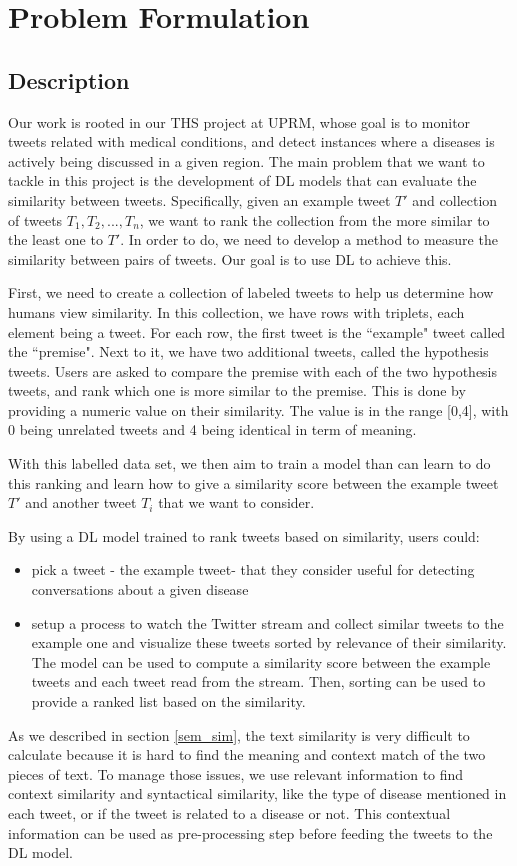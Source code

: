 \documentclass[12pt]{report}
\begin{document}
\chapter{Problem Formulation} \label{chapter 3}
\section{Description}
Our work is rooted in our \ac{THS} project at UPRM, whose goal is to monitor tweets related with medical conditions, and detect instances where
a diseases is actively being discussed in a given region.
The main problem that we want to tackle in this project is the development of  \ac{DL} models that can evaluate the similarity between
tweets. Specifically, given an example tweet $T'$ and  collection of tweets $T_1, T_2, ..., T_n$, we want to rank the collection 
from the more similar to the least one to $T'$. In order to do, we need to develop a method to measure the similarity between pairs of 
tweets. Our goal is to use \ac{DL} to achieve this. 

First, we need to create a collection of labeled tweets to help us determine how humans 
view similarity. In this collection, we have rows with triplets, each element being a tweet. For each row, the first tweet is the ``example" tweet called the ``premise". Next to it, we have two additional tweets, called the
hypothesis tweets. Users are asked to compare the premise with each of the two hypothesis tweets, and rank which one is more similar to the 
premise. This is done by providing a numeric value on their similarity. The value is in the range [0,4], with 0 being unrelated tweets and 4 being identical in term of meaning.

With this labelled data set, we then aim to train a model than can learn to do this ranking and learn how to give a similarity score between 
the example tweet $T'$ and another tweet $T_i$ that we want to consider. \cite{Wang2014}

By using a \ac{DL} model trained to rank tweets based on similarity, users could: 
\begin{itemize}
	\item pick a tweet - the example tweet- that they consider useful for detecting conversations about a given disease 
	\item setup a process to watch the Twitter stream and collect similar tweets to the example one and visualize these tweets  sorted by 
	relevance of their similarity. The model can be used to compute a similarity score between the example tweets and each tweet read from the stream. Then, sorting can be used to provide a ranked list based on the similarity.
\end{itemize} 
As we described in section \ref{sem_sim}, the  text similarity is very difficult to calculate  because it is hard to find the meaning and context match of the two pieces of text. To manage those issues, we use relevant information to find context similarity and syntactical similarity, like the type of disease mentioned in each tweet,  or if the tweet is related to a disease or not. This contextual information can be used as pre-processing step before feeding 
the tweets to the \ac{DL} model.
\end{document}
